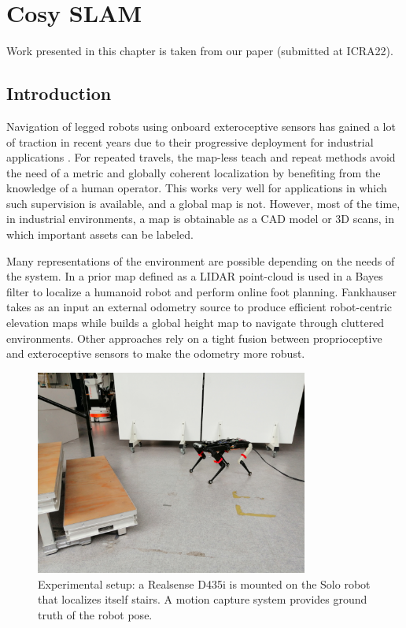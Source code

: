 \chapter{Cosy SLAM}
\label{chp:cosyslam}
\minitoc
\bigskip


Work presented in this chapter is taken from our paper \cite{debeunne2021cosyslam} (submitted at ICRA22).

\section{Introduction}
Navigation of legged robots using onboard exteroceptive sensors has gained a lot of traction in recent years due to their progressive deployment for 
industrial applications \cite{bellicoso2018advances}. 
For repeated travels, the map-less teach and repeat methods \cite{furgale2010visual, mattamala2021learning} avoid the need of a metric and globally coherent localization 
by benefiting from the knowledge of a human operator. This works very well for applications in which such supervision is available, and a global map is not. 
However, most of the time, in industrial environments, a map is obtainable as a CAD model or 3D scans, in which important assets can be labeled.

Many representations of the environment are possible depending on the needs of the system. In \cite{fallon2014drift} a prior map defined as a LIDAR point-cloud is 
used in a Bayes filter to localize a humanoid robot and perform online foot planning. Fankhauser \cite{fankhauser2014robot} takes as an input 
an external odometry source to produce efficient robot-centric elevation maps while \cite{ kim2020vision} builds a global height map to navigate through cluttered 
environments. Other approaches \cite{wisth2021vilens} rely on a tight fusion between proprioceptive and exteroceptive sensors to make the odometry more robust. 

\begin{figure}%
  \centering
  \includegraphics[width=0.80\textwidth]{figures/cosyslam/solo_closer_small.png}
  \caption{Experimental setup: a Realsense D435i is mounted on the Solo robot that localizes itself \wrt stairs. A motion capture system provides ground 
            truth of the robot pose.}
  \label{fig:solo_and_stairs}
\end{figure}

